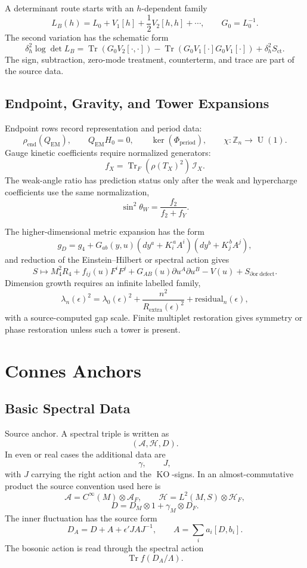 \documentclass[11pt]{article}
\newcommand{\AF}{\mathcal A_F}
\newcommand{\DF}{D_F}
\newcommand{\DA}{D_A}
\newcommand{\Tr}{\operatorname{Tr}}
\newcommand{\U}{\operatorname{U}}
\newcommand{\KO}{\operatorname{KO}}
\begin{document}
A determinant route starts with an \(h\)-dependent family
\[
  L_B(h)=L_0+V_1[h]+\frac12V_2[h,h]+\cdots,\qquad G_0=L_0^{-1}.
\]
The second variation has the schematic form
\[
  \delta_h^2\log\det L_B
   =\Tr(G_0V_2[\cdot,\cdot])
    -\Tr(G_0V_1[\cdot]G_0V_1[\cdot])
    +\delta_h^2 S_{\mathrm{ct}} .
\]
The sign, subtraction, zero-mode treatment, counterterm, and trace are part
of the source data.

\subsection{Endpoint, Gravity, and Tower Expansions}

Endpoint rows record representation and period data:
\[
  \rho_{\mathrm{end}}(Q_{\mathrm{EM}}),\qquad
  Q_{\mathrm{EM}}H_0=0,\qquad
  \ker(\Phi_{\mathrm{period}}),\qquad
  \chi:\mathbb Z_n\to \U(1).
\]
Gauge kinetic coefficients require normalized generators:
\[
  f_X=\Tr_F(\rho(T_X)^2)\,\mathcal I_X .
\]
The weak-angle ratio has prediction status only after the weak and
hypercharge coefficients use the same normalization,
\[
  \sin^2\theta_W=\frac{f_2}{f_2+f_Y}.
\]

The higher-dimensional metric expansion has the form
\[
  g_D
  =g_4
   +G_{ab}(y,u)
    (dy^a+K_i^{\,a}A^i)(dy^b+K_j^{\,b}A^j),
\]
and reduction of the Einstein--Hilbert or spectral action gives
\[
  S\mapsto
  M_4^2R_4
  +f_{ij}(u)F^iF^j
  +G_{AB}(u)\partial u^A\partial u^B
  -V(u)
  +S_{\partial\mathrm{or\ defect}} .
\]
Dimension growth requires an infinite labelled family,
\[
  \lambda_n(\epsilon)^2
  =\lambda_0(\epsilon)^2
   +\frac{n^2}{R_{\mathrm{extra}}(\epsilon)^2}
   +\mathrm{residual}_n(\epsilon),
\]
with a source-computed gap scale.  Finite multiplet restoration gives
symmetry or phase restoration unless such a tower is present.

\section{Connes Anchors}

\subsection{Basic Spectral Data}

Source anchor.  A spectral triple is written as
\[
  (\mathcal A,\mathcal H,D).
\]
In even or real cases the additional data are
\[
  \gamma,\qquad J,
\]
with \(J\) carrying the right action and the \(\KO\)-signs.  In an
almost-commutative product the source convention used here is
\[
  \mathcal A=C^\infty(M)\otimes \AF,
  \qquad
  \mathcal H=L^2(M,S)\otimes \mathcal H_F,
\]
\[
  D=D_M\otimes 1+\gamma_M\otimes \DF.
\]
The inner fluctuation has the source form
\[
  \DA=D+A+\epsilon' JAJ^{-1},
  \qquad
  A=\sum_i a_i[D,b_i].
\]
The bosonic action is read through the spectral action
\[
  \Tr f(\DA/\Lambda).
\]
\end{document}
